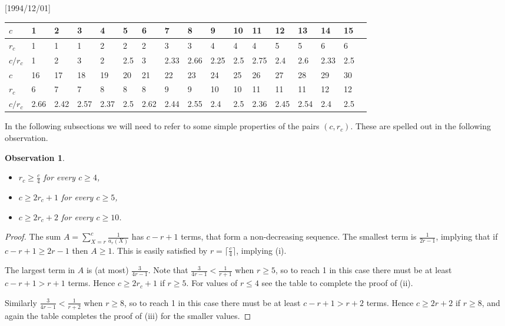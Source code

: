 \NeedsTeXFormat{LaTeX2e}[1994/12/01]\documentclass[letterpaper, 11pt]{article}
\newtheorem{obs}[thm]{Observation}
\theoremstyle{definition}
\theoremstyle{remark}
\numberwithin{equation}{section}
\begin{document}
\begin{center}
\smallskip
\begin{small}
\begin{tabular}{|l|l|l|l|l|l|l|l|l|l|l|l|l|l|l|l|l|}
\hline {$c$}&1&2&3&4&5&6&7&8&9&10&11&12&13&14&15\\
\hline {$r_c$}&1&1&1&2&2&2&3&3&4&4&4&5&5&6&6\\
\hline {$c/r_c$}&1&2&3&2 &2.5 &3 &2.33&2.66&2.25&2.5&2.75&2.4&2.6&2.33&2.5\\
\hline
\hline {$c$}&16&17&18&19&20&21&22&23&24&25&26&27&28&29&30\\\hline {$r_c$}&6&7&7&8&8&8&9&9&10&10&11&11&11&12&12\\\hline {$c/r_c$}&2.66&2.42&2.57&2.37&2.5&2.62&2.44&2.55&2.4 &2.5 &2.36 &2.45&2.54&2.4&2.5\\\hline 

 \end{tabular}
\end{small}
\smallskip
\end{center}








In the following subsections we will need to refer to some simple properties of
the pairs $(c,r_c)$. These are spelled out in the following observation.
\begin{obs}\label{obs:crc}
  \begin{itemize}
  \item[(i)] $r_c\geq\frac{c}4$ for every $c\geq 4$,
  \item[(ii)] $c\geq 2r_c+1$ for every $c\geq 5$,
  \item[(iii)] $c\geq 2r_c+2$ for every $c\geq 10$.
  \end{itemize}
\end{obs}
\begin{proof}
The sum 
$A=\sum_{X=r}^c\frac1{a_r(X)}$ has $c-r+1$ terms, that form a
non-decreasing sequence. The smallest term is $\frac1{2r-1}$, implying
that if $c-r+1\geq 2r-1$ then $A\geq 1$. This is easily satisfied by
$r=\lceil\frac{c}4\rceil$, implying (i).

The largest term in $A$ is (at most)
$\frac3{4r-1}$. Note that $\frac3{4r-1}<\frac1{r+1}$ when $r\geq5$, so to
reach 1 in this case there must be at least $c-r+1>r+1$ terms. Hence
$c\geq2r_c+1$ if $r\geq5$. For values of $r\leq 4$ see the table to
complete the proof of (ii).

Similarly $\frac3{4r-1}<\frac1{r+2}$ when $r\geq 8$, so to
reach 1 in this case there must be at least $c-r+1>r+2$ terms. Hence
$c\geq2r+2$ if $r\geq 8$, and again the table completes the proof of (iii) for
the smaller values.
\end{proof}
\end{document}
